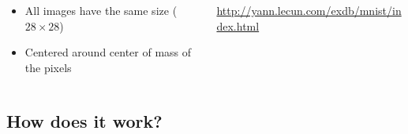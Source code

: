 \begin{frame}
\begin{columns}
\begin{column}{0.5\textwidth}
\begin{itemize}
\begin{itemize}
        \item All images have the same size ($28 \times 28$)
        \item Centered around center of mass of the pixels
        \end{itemize}
      \end{itemize}
    \end{column}
    \begin{column}{0.5\textwidth}
      \url{http://yann.lecun.com/exdb/mnist/index.html}
    \end{column}
  \end{columns}
\end{frame}


\subsection{How does it work?}

